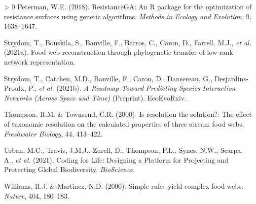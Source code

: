 \documentclass[11pt]{article}
\newlength{\cslhangindent}
\newenvironment{CSLReferences}[3] %
 {%
  \setlength{\parindent}{0pt}
  \ifodd #1 \everypar{\setlength{\hangindent}{\cslhangindent}}\ignorespaces\fi
  \ifnum #2 > 0
  \setlength{\parskip}{#2\baselineskip}
  \fi
 }%
 {}
\begin{document}
\begin{CSLReferences}{1}{0}
\leavevmode\hypertarget{ref-Peterman2018ResRP}{}%
Peterman, W.E. (2018). ResistanceGA: An R package for the optimization
of resistance surfaces using genetic algorithms. \emph{Methods in
Ecology and Evolution}, 9, 1638--1647.

\leavevmode\hypertarget{ref-Strydom2021FooWeb}{}%
Strydom, T., Bouskila, S., Banville, F., Barros, C., Caron, D., Farrell,
M.J., \emph{et al.} (2021a). Food web reconstruction through
phylogenetic transfer of low-rank network representation.

\leavevmode\hypertarget{ref-Strydom2021RoaPre}{}%
Strydom, T., Catchen, M.D., Banville, F., Caron, D., Dansereau, G.,
Desjardins-Proulx, P., \emph{et al.} (2021b). \emph{A Roadmap Toward
Predicting Species Interaction Networks (Across Space and Time)}
(Preprint). EcoEvoRxiv.

\leavevmode\hypertarget{ref-Thompson2000ResSol}{}%
Thompson, R.M. \& Townsend, C.R. (2000). Is resolution the solution?:
The effect of taxonomic resolution on the calculated properties of three
stream food webs. \emph{Freshwater Biology}, 44, 413--422.

\leavevmode\hypertarget{ref-Urban2021CodLif}{}%
Urban, M.C., Travis, J.M.J., Zurell, D., Thompson, P.L., Synes, N.W.,
Scarpa, A., \emph{et al.} (2021). Coding for Life: Designing a Platform
for Projecting and Protecting Global Biodiversity. \emph{BioScience}.

\leavevmode\hypertarget{ref-Williams2000SimRul}{}%
Williams, R.J. \& Martinez, N.D. (2000). Simple rules yield complex food
webs. \emph{Nature}, 404, 180--183.

\end{CSLReferences}
\end{document}
